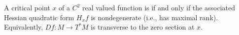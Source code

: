 A critical point $x$ of a $C^2$ real valued function is  if and only if the associated Hessian quadratic form $H_x f$ is nondegenerate (i.e., has maximal rank). Equivalently, $Df: M \to T^*M$ is transverse to the zero section at $x$.

